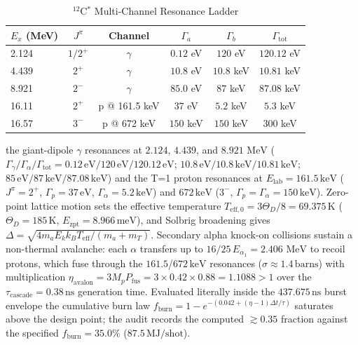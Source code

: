 \documentclass[11pt,journal,compsoc]{IEEEtran}
\newcommand{\MeV}{\,\mathrm{MeV}}
\begin{document}
\begin{table}[h]
\centering
\caption{$^{12}$C$^*$ Multi-Channel Resonance Ladder}
\label{tab:resonances}
\footnotesize
\setlength{\tabcolsep}{2pt}
\begin{tabular}{lccccc}
\toprule
$E_x$ (MeV) & $J^\pi$ & Channel & $\Gamma_a$ & $\Gamma_b$ &
$\Gamma_{\mathrm{tot}}$ \\ \midrule
2.124  & $1/2^+$ & $\gamma$ & $0.12$ eV  & $120$ eV  & $120.12$ eV \\
4.439  & $2^+$   & $\gamma$ & $10.8$ eV  & $10.8$ keV & $10.81$ keV \\
8.921  & $2^-$   & $\gamma$ & $85.0$ eV  & $87$ keV   & $87.08$ keV \\
16.11  & $2^+$   & p @ 161.5 keV & $37$ eV & $5.2$ keV & $5.3$ keV \\
16.57  & $3^-$   & p @ 672 keV   & $150$ keV & $150$ keV & $300$ keV \\
\bottomrule
\end{tabular}
\end{table}

the giant-dipole
$\gamma$ resonances at $2.124$, $4.439$, and $8.921\,\MeV$
($\Gamma_{\gamma}/\Gamma_\alpha/\Gamma_{\mathrm{tot}} = 0.12\,
\mathrm{eV}/120\,\mathrm{eV}/120.12\,\mathrm{eV}$; $10.8\,
\mathrm{eV}/10.8\,\mathrm{keV}/10.81\,\mathrm{keV}$; $85\,
\mathrm{eV}/87\,\mathrm{keV}/87.08\,\mathrm{keV}$) and the T=1 proton
resonances at $E_{\mathrm{lab}} = 161.5\,\mathrm{keV}$ ($J^\pi = 2^+$,
$\Gamma_p = 37\,\mathrm{eV}$, $\Gamma_\alpha = 5.2\,\mathrm{keV}$)
and $672\,\mathrm{keV}$ ($3^-$, $\Gamma_p = \Gamma_\alpha =
150\,\mathrm{keV}$). Zero-point lattice motion sets the effective
temperature $T_{\mathrm{eff},0} = 3\Theta_D/8 = 69.375\,\mathrm{K}$
($\Theta_D = 185\,\mathrm{K}$, $E_{\mathrm{zpt}} = 8.966\,
\mathrm{meV}$), and Solbrig broadening gives
$\Delta = \sqrt{4m_a E_k k_B T_{\mathrm{eff}}/(m_a + m_T)}$.
Secondary alpha knock-on collisions sustain a non-thermal avalanche:
each $\alpha$ transfers up to $16/25\,E_{\alpha_1} = 2.406\,\MeV$ to
recoil protons, which fuse through the $161.5$/$672\,\mathrm{keV}$
resonances ($\sigma \approx 1.4\,\mathrm{barns}$) with multiplication
$\eta_{\mathrm{avalon}} = 3 M_p P_{\mathrm{fus}} = 3\times0.42\times
0.88 = 1.1088 > 1$ over the $\tau_{\mathrm{cascade}} = 0.38\,
\mathrm{ns}$ generation time. Evaluated literally inside the
$437.675\,\mathrm{ns}$ burst envelope the cumulative burn law
$f_{\mathrm{burn}} = 1 - e^{-(0.042 + (\eta-1)\Delta t/\tau)}$
saturates above the design point; the audit records the computed
$\gtrsim 0.35$ fraction against the specified $f_{\mathrm{burn}} =
35.0\%$ ($87.5\,\mathrm{MJ/shot}$).
\end{document}

